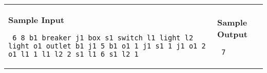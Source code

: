 \documentclass[11pt]{article}
\begin{document}
\vspace{0.25in}\hspace{-0.3in}\begin{tabular}{ll}

\parbox{3in}{{\large\bf Sample Input}

\vspace{0.15in}

{\tt 
6 8\linebreak
b1 breaker\linebreak
j1 box\linebreak
s1 switch\linebreak
l1 light\linebreak
l2 light\linebreak
o1 outlet\linebreak
b1 j1 5\linebreak
b1 o1 1\linebreak
j1 s1 1\linebreak
j1 o1 2\linebreak
o1 l1 1\linebreak
l1 l2 2\linebreak
s1 l1 6\linebreak
s1 l2 1\linebreak
}
}

&

\parbox{3in}{{\large\bf Sample Output}

\vspace{0.15in}

{\tt
7
}
}

\\
\end{tabular}
\end{document}
